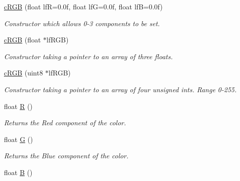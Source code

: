 \begin{DoxyCompactItemize}
\item 
\hypertarget{classc_r_g_b_a833a818aae27ee4dde171f2e317585d4}{
\hyperlink{classc_r_g_b_a833a818aae27ee4dde171f2e317585d4}{cRGB} (float lfR=0.0f, float lfG=0.0f, float lfB=0.0f)}
\label{classc_r_g_b_a833a818aae27ee4dde171f2e317585d4}

\begin{DoxyCompactList}\small\item\em Constructor which allows 0-\/3 components to be set. \end{DoxyCompactList}\item 
\hypertarget{classc_r_g_b_a9f0e889346aaec9a19b1a7fd2400a53e}{
\hyperlink{classc_r_g_b_a9f0e889346aaec9a19b1a7fd2400a53e}{cRGB} (float $\ast$lfRGB)}
\label{classc_r_g_b_a9f0e889346aaec9a19b1a7fd2400a53e}

\begin{DoxyCompactList}\small\item\em Constructor taking a pointer to an array of three floats. \end{DoxyCompactList}\item 
\hypertarget{classc_r_g_b_a1206513bc7e2a45214aa0daa8ecf0cc9}{
\hyperlink{classc_r_g_b_a1206513bc7e2a45214aa0daa8ecf0cc9}{cRGB} (uint8 $\ast$lfRGB)}
\label{classc_r_g_b_a1206513bc7e2a45214aa0daa8ecf0cc9}

\begin{DoxyCompactList}\small\item\em Constructor taking a pointer to an array of four unsigned ints. Range 0-\/255. \end{DoxyCompactList}\item 
\hypertarget{classc_r_g_b_a701ca35633538dad46c30e2932543f1d}{
float \hyperlink{classc_r_g_b_a701ca35633538dad46c30e2932543f1d}{R} ()}
\label{classc_r_g_b_a701ca35633538dad46c30e2932543f1d}

\begin{DoxyCompactList}\small\item\em Returns the Red component of the color. \end{DoxyCompactList}\item 
\hypertarget{classc_r_g_b_a1e34ef9bd5e4379d6289600ce2c105ae}{
float \hyperlink{classc_r_g_b_a1e34ef9bd5e4379d6289600ce2c105ae}{G} ()}
\label{classc_r_g_b_a1e34ef9bd5e4379d6289600ce2c105ae}

\begin{DoxyCompactList}\small\item\em Returns the Blue component of the color. \end{DoxyCompactList}\item 
\hypertarget{classc_r_g_b_a41d85feae44ddfa8af7244d57a43b284}{
float \hyperlink{classc_r_g_b_a41d85feae44ddfa8af7244d57a43b284}{B} ()}
\label{classc_r_g_b_a41d85feae44ddfa8af7244d57a43b284}


\end{DoxyCompactItemize}
